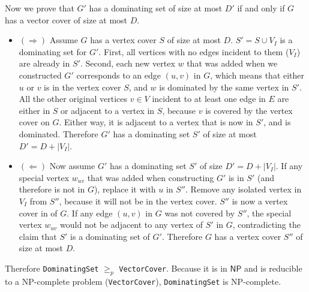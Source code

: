 \documentclass[a4paper, 10pt]{article}
\begin{document}
\begin{enumerate}
		Now we prove that $G'$ has a dominating set of size at most $D'$ if and
		only if $G$ has a vector cover of size at most $D$.
		
		\begin{itemize}
			\item $( \Rightarrow )$ Assume $G$ has a vertex cover $S$ of size at
				most $D$. $S' = S \cup V_I$ is a dominating set for $G'$.
				First, all vertices with no edges incident to them ($V_I$) are
				already in $S'$. Second, each new vertex $w$ that was added when
				we constructed $G'$ corresponds to an edge $(u, v)$ in $G$,
				which means that either $u$ or $v$ is in the vertex cover $S$,
				and $w$ is dominated by the same vertex in $S'$. All the other
				original vertices $v \in V$ incident to at least one edge in $E$
				are either in $S$ or adjacent to a vertex in $S$, because $v$ is
				covered by the vertex cover on $G$. Either way, it is adjacent
				to a vertex that is now in $S'$, and is dominated. Therefore
				$G'$ has a dominating set $S'$ of size at most $D' = D + |V_I|$.

			\item $( \Leftarrow )$ Now assume $G'$ has a dominating set $S'$ of
				size $D' = D + |V_I|$. If any special vertex $w_{uv}$ that was
				added when constructing $G'$ is in $S'$ (and therefore is not in
				$G$), replace it with $u$ in $S''$. Remove any isolated vertex in
				$V_I$ from $S''$, because it will not be in the vertex cover.
				$S''$ is now a vertex cover in of $G$. If any edge $(u, v)$ in
				$G$ was not covered by $S''$, the special vertex $w_{uv}$ would
				not be adjacent to any vertex of $S'$ in $G$, contradicting the
				claim that $S'$ is a dominating set of $G'$. Therefore $G$ has a
				vertex cover $S''$ of size at most $D$.
		\end{itemize}

		Therefore \texttt{DominatingSet} $\ge_p$ \texttt{VectorCover}.  Because
		it is in $\mathsf{NP}$ and is reducible to a NP-complete problem
		(\texttt{VectorCover}), \texttt{DominatingSet} is NP-complete.
\end{enumerate}
\end{document}
